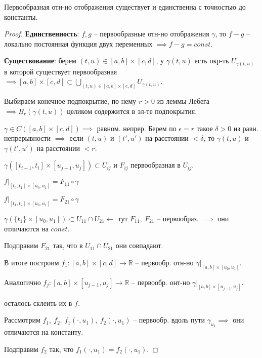 \begin{theorem}
    Первообразная отн-но отображения существует и единственна с точностью до константы.
\end{theorem}
\begin{proof}
    
    \textbf{Единственность}: $f, g$ -- первообразные отн-но отображения $\gamma$, то $f - g$ -- локально постоянная функция двух переменных $\implies f - g = const$.

    \textbf{Существование}: берем $(t, u) \in [a, b] \times [c, d]$, у $\gamma(t, u)$ есть окр-ть $U_{\gamma(t, u)}$ в которой существует первообразная $\implies [a, b] \times [c, d] \subset \bigcup_{(t, u) \in [a, b] \times [c, d]} {U_{\gamma(t, u)}}$.
    
    Выбираем конечное подпокрытие, по нему $r > 0$ из леммы Лебега $\implies B_r(\gamma(t, u))$ целиком содержится в эл-те подпокрытия.
    
    $\gamma \in C\left( [a, b] \times [c, d] \right) \implies $ равном. непрер. Берем по $\epsilon = r$ такое $\delta > 0$ из равн. непрерывности $\implies$ если $(t, u)$ и $(t', u')$ на расстоянии $< \delta$, то $\gamma(t, u)$ и $\gamma(t', u')$ на расстоянии $< r$.

    $\gamma([t_{i - 1}, t_i] \times [u_{j - 1}, u_j]) \subset U_{ij}$ и $F_{ij}$ первообразная в $U_{ij}$.

    $f|_{[t_0, t_1] \times [u_0, u_1]} = F_{11} \circ \gamma$
    
    $f|_{[t_1, t_2] \times [u_0, u_1]} = F_{21} \circ \gamma$

    $\gamma(\{ t_1 \} \times [u_0, u_1]) \subset U_{11} \cap U_{21} \leftarrow$ тут $F_{11}, \ F_{21}$ -- первообраз. $\implies$ они отличаются на $const$.

    Подправим $F_{21}$ так, что в $U_{11} \cap U_{21}$ они совпадают.

    В итоге построим $f_1: [a, b] \times [c, d] \rightarrow \mathbb{R}$ -- первообр. отн-но $\gamma|_{[a, b] \times [u_0, u_1]}$.

    Аналогично $f_j: [a, b] \times [u_{j - 1}, u_j] \rightarrow \mathbb{R}$ -- первообр. онт-но $\gamma|_{[a, b] \times [u_{j - 1}, u_j]}$.

    осталось склеить их в $f$.

    Рассмотрим $f_1, \ f_2$. $f_1(\cdot, u_1), \ f_2(\cdot, u_1)$ -- первообр. вдоль пути $\gamma_{u_1} \implies$ они отличаются на константу.

    Подправим $f_2$ так, что $f_1(\cdot, u_1) = f_2(\cdot, u_1)$.

\end{proof}


